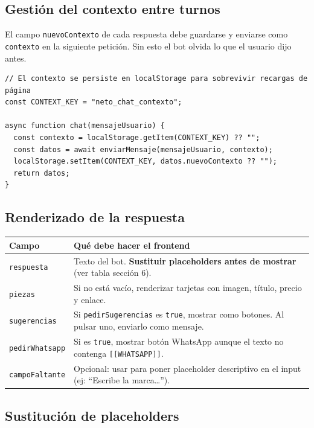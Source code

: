 \documentclass[12pt, a4paper]{article}
\begin{document}
\subsection{Gestión del contexto entre turnos}

El campo \texttt{nuevoContexto} de cada respuesta debe guardarse y enviarse como \texttt{contexto} en la siguiente petición. Sin esto el bot olvida lo que el usuario dijo antes.

\begin{lstlisting}[style=js, caption={Gestión del contexto conversacional}]
// El contexto se persiste en localStorage para sobrevivir recargas de página
const CONTEXT_KEY = "neto_chat_contexto";

async function chat(mensajeUsuario) {
  const contexto = localStorage.getItem(CONTEXT_KEY) ?? "";
  const datos = await enviarMensaje(mensajeUsuario, contexto);
  localStorage.setItem(CONTEXT_KEY, datos.nuevoContexto ?? "");
  return datos;
}
\end{lstlisting}

\subsection{Renderizado de la respuesta}

\begin{center}
\renewcommand{\arraystretch}{1.3}
\begin{tabularx}{\textwidth}{lX}
\toprule
\textbf{Campo} & \textbf{Qué debe hacer el frontend} \\
\midrule
\texttt{respuesta}        & Texto del bot. \textbf{Sustituir placeholders antes de mostrar} (ver tabla sección 6). \\
\texttt{piezas}           & Si no está vacío, renderizar tarjetas con imagen, título, precio y enlace. \\
\texttt{sugerencias}      & Si \texttt{pedirSugerencias} es \texttt{true}, mostrar como botones. Al pulsar uno, enviarlo como mensaje. \\
\texttt{pedirWhatsapp}    & Si es \texttt{true}, mostrar botón WhatsApp aunque el texto no contenga \texttt{[[WHATSAPP]]}. \\
\texttt{campoFaltante}    & Opcional: usar para poner placeholder descriptivo en el input (ej: ``Escribe la marca\ldots''). \\
\bottomrule
\end{tabularx}
\end{center}

\subsection{Sustitución de placeholders}
\end{document}
